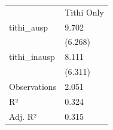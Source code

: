 \begin{tabular}{ll}
& Tithi Only \\
tithi\_ausp & \num{9.702} \\
& (\num{6.268}) \\
tithi\_inausp & \num{8.111} \\
& (\num{6.311}) \\
Observations & \num{2,051} \\
R² & \num{0.324} \\
Adj. R² & \num{0.315} \\
\end{tabular}
